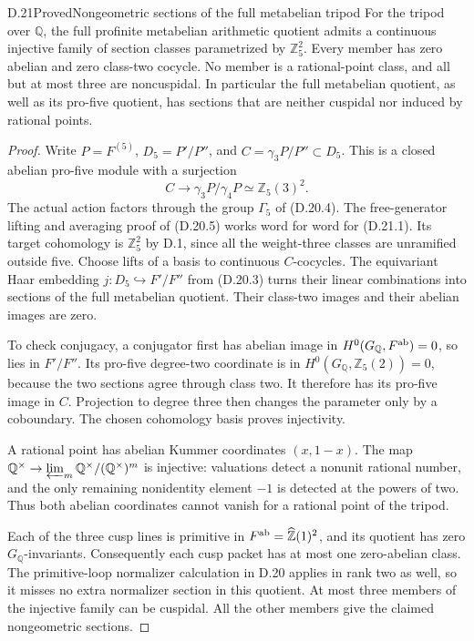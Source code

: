 \begin{statement}{D.21}{Proved}{Nongeometric sections of the full metabelian tripod}
For the tripod over \(\mathbb Q\), the full profinite
metabelian arithmetic quotient admits a continuous
injective family of section classes parametrized by
\(\mathbb Z_5^2\). Every member has zero abelian and
zero class-two cocycle. No member is a rational-point
class, and all but at most three are noncuspidal.
In particular the full metabelian quotient, as well
as its pro-five quotient, has sections that are
neither cuspidal nor induced by rational points.
\end{statement}
\begin{proof}
Write \(P=F^{(5)}\), \(D_5=P'/P''\), and
\(C=\gamma_3P/P''\subset D_5\). This is a closed
abelian pro-five module with a surjection
\[
 C\longrightarrow\gamma_3P/\gamma_4P
             \simeq\mathbb Z_5(3)^2.                 \tag{D.21.1}
\]
The actual action factors through the group
\(\Gamma_5\) of (D.20.4). The free-generator
lifting and averaging proof of (D.20.5) works
word for word for (D.21.1). Its target cohomology
is \(\mathbb Z_5^2\) by D.1, since all the
weight-three classes are unramified outside five.
Choose lifts of a basis to continuous \(C\)-cocycles.
The equivariant Haar embedding
\(j:D_5\hookrightarrow F'/F''\) from (D.20.3)
turns their linear combinations into sections
of the full metabelian quotient. Their class-two
images and their abelian images are zero.

To check conjugacy, a conjugator first has
abelian image in \(H^0(G_{\mathbb Q},F^{\rm ab})=0\),
so lies in \(F'/F''\). Its pro-five degree-two
coordinate is in \(H^0(G_{\mathbb Q},\mathbb Z_5(2))=0\),
because the two sections agree through class two.
It therefore has its pro-five image in \(C\).
Projection to degree three then changes the
parameter only by a coboundary. The chosen
cohomology basis proves injectivity.

A rational point has abelian Kummer coordinates
\((x,1-x)\). The map
\(\mathbb Q^\times\to\varprojlim_m
\mathbb Q^\times/(\mathbb Q^\times)^m\) is injective:
valuations detect a nonunit rational number,
and the only remaining nonidentity element
\(-1\) is detected at the powers of two.
Thus both abelian coordinates cannot vanish
for a rational point of the tripod.

Each of the three cusp lines is primitive
in \(F^{\rm ab}=\widehat{\mathbb Z}(1)^2\),
and its quotient has zero \(G_{\mathbb Q}\)-invariants.
Consequently each cusp packet has at most one
zero-abelian class. The primitive-loop
normalizer calculation in D.20 applies in
rank two as well, so it misses no extra
normalizer section in this quotient. At most
three members of the injective family can
be cuspidal. All the other members give the
claimed nongeometric sections.
\end{proof}

